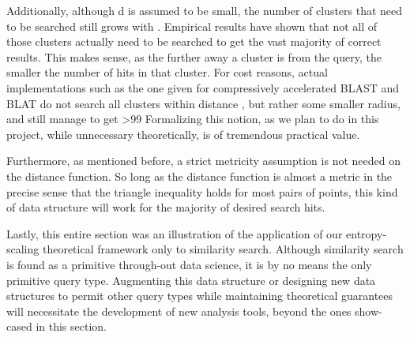 \documentclass{amsbook}
\theoremstyle{definition}
\theoremstyle{remark}
\numberwithin{equation}{section}
\begin{document}
Additionally, although d is assumed to be small, the number of clusters that need to be searched still grows with .
Empirical results have shown that not all of those clusters actually need to be searched to get the vast majority of correct results.
This makes sense, as the further away a cluster is from the query, the smaller the number of hits in that cluster.
For cost reasons, actual implementations such as the one given for compressively accelerated BLAST and BLAT do not search all clusters within distance , but rather some smaller radius, and still manage to get >99%
Formalizing this notion, as we plan to do in this project, while unnecessary theoretically, is of tremendous practical value.

Furthermore, as mentioned before, a strict metricity assumption is not needed on the distance function.
So long as the distance function is almost a metric in the precise sense that the triangle inequality holds for most pairs of points, this kind of data structure will work for the majority of desired search hits.

Lastly, this entire section was an illustration of the application of our entropy-scaling theoretical framework only to similarity search.
Although similarity search is found as a primitive through-out data science, it is by no means the only primitive query type.
Augmenting this data structure or designing new data structures to permit other query types while maintaining theoretical guarantees will necessitate the development of new analysis tools, beyond the ones show-cased in this section.
\end{document}

